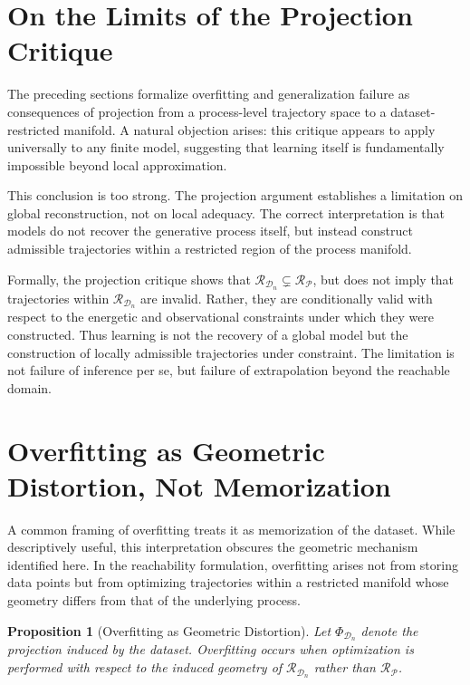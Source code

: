 \documentclass[12pt]{article}
\theoremstyle{plain}
\newtheorem{proposition}[theorem]{Proposition}
\theoremstyle{definition}
\theoremstyle{remark}
\begin{document}
\section{On the Limits of the Projection Critique}

The preceding sections formalize overfitting and generalization failure as consequences of projection from a process-level trajectory space to a dataset-restricted manifold. A natural objection arises: this critique appears to apply universally to any finite model, suggesting that learning itself is fundamentally impossible beyond local approximation.

This conclusion is too strong. The projection argument establishes a limitation on global reconstruction, not on local adequacy. The correct interpretation is that models do not recover the generative process itself, but instead construct admissible trajectories within a restricted region of the process manifold.

Formally, the projection critique shows that $\mathcal{R}_{\mathcal{D}_n} \subsetneq \mathcal{R}_{\mathcal{P}}$, but does not imply that trajectories within $\mathcal{R}_{\mathcal{D}_n}$ are invalid. Rather, they are conditionally valid with respect to the energetic and observational constraints under which they were constructed. Thus learning is not the recovery of a global model but the construction of locally admissible trajectories under constraint. The limitation is not failure of inference per se, but failure of extrapolation beyond the reachable domain.

\section{Overfitting as Geometric Distortion, Not Memorization}

A common framing of overfitting treats it as memorization of the dataset. While descriptively useful, this interpretation obscures the geometric mechanism identified here. In the reachability formulation, overfitting arises not from storing data points but from optimizing trajectories within a restricted manifold whose geometry differs from that of the underlying process.

\begin{proposition}[Overfitting as Geometric Distortion]
Let $\Phi_{\mathcal{D}_n}$ denote the projection induced by the dataset. Overfitting occurs when optimization is performed with respect to the induced geometry of $\mathcal{R}_{\mathcal{D}_n}$ rather than $\mathcal{R}_{\mathcal{P}}$.
\end{proposition}
\end{document}
